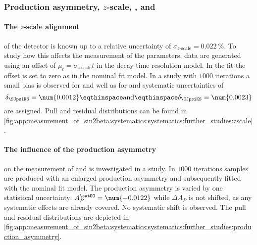 \subsubsection[Production asymmetry, $z$-scale, DMd, and DGd]{Production asymmetry, $z$-scale, \DMd, and \DGd}
\label{sec:measurement_of_sin2beta:systematics:systematics:further_studies}

\paragraph{The $z$-scale alignment} of the \LHCb detector is known up to a
relative uncertainty of $\sigma_\text{$z$-scale} = \SI{0.022}{\percent}$. To
study how this affects the measurement of the \CP parameters, data are generated
using an offset of $\mu_{t} = \sigma_\text{$z$-scale} t$ in the decay time
resolution model. In the fit the offset is set to zero as in the nominal fit
model. In a \ToyMC study with $\num{1000}$ iterations a small bias is observed
for \SJpsiKS and well as for \CJpsiKS and systematic uncertainties of
%
\begin{equation}
  \delta_{\SJpsiKS} = \num{0.0012}\eqthinspace\text{and}\eqthinspace\delta_{\CJpsiKS} = \num{0.0023}
\end{equation}
%
are assigned. Pull and residual distributions can be found in
\cref{fig:app:measurement_of_sin2beta:systematics:systematics:further_studies:zscale}.

\paragraph{The influence of the production asymmetry} on the measurement of
\SJpsiKS and \CJpsiKS is investigated in a \ToyMC study. In $\num{1000}$
iterations samples are produced with an enlarged production asymmetry and
subsequently fitted with the nominal fit model. The production asymmetry is
varied by one statistical uncertainty: $A_P^{\catOO} = \num{-0.0122}$ while
$\Delta A_P$ is not shifted, as any systematic effects are already covered. No
systematic shift is observed. The pull and residual distributions are depicted
in \cref{fig:app:measurement_of_sin2beta:systematics:systematics:further_studies:production_asymmetry}.

